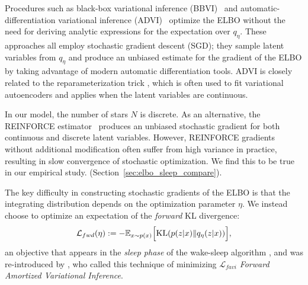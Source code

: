 
Procedures such as black-box variational inference (BBVI)~\citep{ranganath2013black} and
automatic-differentiation variational inference (ADVI)~\citep{kucukelbir2016automatic}
optimize the ELBO  without the need for
deriving analytic expressions for the expectation over $q_\eta$.
These approaches all employ stochastic gradient descent (SGD);
they sample latent variables from $q_\eta$ and produce an unbiased estimate for the gradient of the ELBO by taking advantage of modern automatic differentiation tools.
ADVI is closely related to the reparameterization trick \citep{kingma2013autoencoding, rezende2014stochastic}, which is often used to fit variational autoencoders and applies when the latent variables are continuous.

In our model, the number of stars $N$ is discrete.
As an alternative, the REINFORCE estimator~\citep{Williams1992reinforce} produces an unbiased stochastic gradient for both continuous and discrete latent variables.
However, REINFORCE gradients without additional modification often suffer from high variance in practice, resulting in slow convergence of stochastic optimization. We find this to be true in our empirical study.  (Section~\ref{sec:elbo_sleep_compare}).

The key difficulty in constructing stochastic gradients of the ELBO is that the
integrating distribution depends on the optimization parameter $\eta$.
We instead choose to optimize an expectation of the \textit{forward} KL divergence:
\begin{align}
    \mathcal{L}_{fwd}(\eta) :=
    - \mathbb{E}_{x \sim p(x)}\Big[\textrm{KL}(p(z | x) \| q_\eta(z | x))\Big]
    \label{eq:sleep_obj},
\end{align}
an objective that appears in the \textit{sleep phase} of the wake-sleep algorithm
\citep{Hinton1995wake_sleep, bornschein2014reweighted,le2020revisiting},
and was re-introduced by \cite{ambrogioni2019favi}, who called this technique
of minimizing $\mathcal{L}_{favi}$ \textit{Forward Amortized Variational Inference}.

